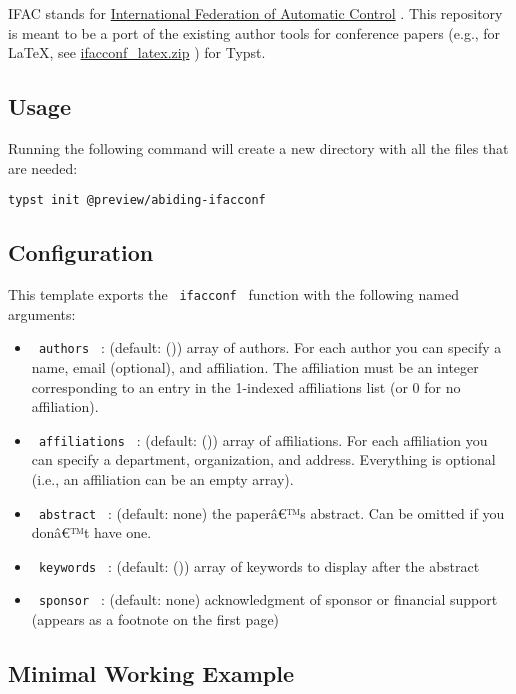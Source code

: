 IFAC stands for \href{https://ifac-control.org/}{International
Federation of Automatic Control} . This repository is meant to be a port
of the existing author tools for conference papers (e.g., for LaTeX, see
\href{https://www.ifac-control.org/conferences/author-guide/copy_of_ifacconf_latex.zip/view}{ifacconf\_latex.zip}
) for Typst.

\subsection{Usage}\label{usage}

Running the following command will create a new directory with all the
files that are needed:

\begin{verbatim}
typst init @preview/abiding-ifacconf
\end{verbatim}

\subsection{Configuration}\label{configuration}

This template exports the \texttt{\ ifacconf\ } function with the
following named arguments:

\begin{itemize}
\tightlist
\item
  \texttt{\ authors\ } : (default: ()) array of authors. For each author
  you can specify a name, email (optional), and affiliation. The
  affiliation must be an integer corresponding to an entry in the
  1-indexed affiliations list (or 0 for no affiliation).
\item
  \texttt{\ affiliations\ } : (default: ()) array of affiliations. For
  each affiliation you can specify a department, organization, and
  address. Everything is optional (i.e., an affiliation can be an empty
  array).
\item
  \texttt{\ abstract\ } : (default: none) the paperâ€™s abstract. Can be
  omitted if you donâ€™t have one.
\item
  \texttt{\ keywords\ } : (default: ()) array of keywords to display
  after the abstract
\item
  \texttt{\ sponsor\ } : (default: none) acknowledgment of sponsor or
  financial support (appears as a footnote on the first page)
\end{itemize}

\subsection{Minimal Working Example}\label{minimal-working-example}

